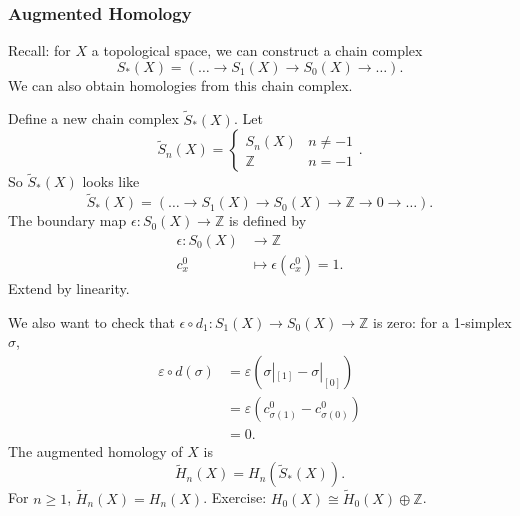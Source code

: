 
\subsubsection{Augmented Homology}

Recall: for $X$ a topological space, we can construct a chain complex 
 \[
	S_*(X) = \left( \ldots \to S_1(X) \to S_0(X) \to  \ldots \right) 
.\] 
We can also obtain homologies from this chain complex.

Define a new chain complex $\tilde S_*(X)$. Let
\[
	\tilde S_n(X) = \begin{cases}
		S_n(X) & n \neq -1 \\
		\mathbb{Z} & n = -1
	\end{cases}
.\] 
So $\tilde S_*(X)$ looks like
\[
	\tilde S_*(X) = \left( \ldots \to  S_1(X) \to S_0(X) \to \mathbb{Z} \to 0 \to \ldots \right) 
.\] 
The boundary map $\epsilon: S_0(X) \to \mathbb{Z}$ is defined by 
\begin{align*}
	\epsilon: S_0(X) &\longrightarrow \mathbb{Z} \\
	c_x^0 &\longmapsto \epsilon(c_x^0) = 1
.\end{align*}
Extend by linearity.

We also want to check that $\epsilon \circ d_1: S_1(X) \to  S_0(X) \to \mathbb{Z}$ is zero: for a 1-simplex $\sigma$,
\begin{align*}
	\varepsilon \circ d(\sigma)
	&= \varepsilon(\sigma|_{[1]} - \sigma|_{[0]}) \\
	&= \varepsilon\left(c^0_{\sigma(1)} - c^0_{\sigma(0)}\right) \\
	&= 0
.\end{align*}
The augmented homology of $X$ is
\[
	\tilde H_n(X) = H_n(\tilde S_*(X))
.\] 
For $n \ge 1$, $\tilde H_n(X) = H_n(X)$.
Exercise: $H_0(X) \cong \tilde H_0(X) \oplus \mathbb{Z}$.
